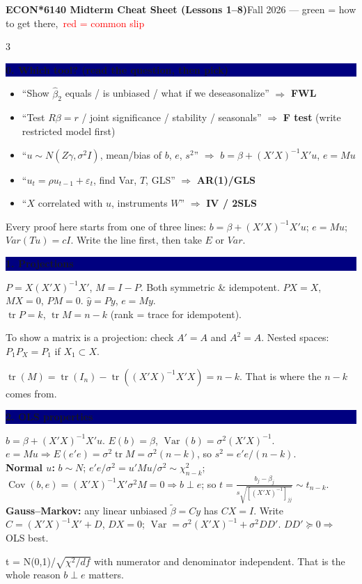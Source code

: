 \documentclass[7.5pt,landscape]{extarticle}
\newcommand{\hd}[1]{\par\vspace{3pt}\noindent\colorbox{navy}{\parbox{\dimexpr\linewidth-2\fboxsep}{\color{white}\bfseries #1}}\par\vspace{1pt}}
\newcommand{\think}[1]{\par\noindent{\color{grn}\textbf{Think:}} {\color{grn}#1}\par}
\newcommand{\warn}[1]{\par\noindent{\color{red}\textbf{Slip:}} {\color{red}#1}\par}
\newcommand{\Var}{\operatorname{Var}}\newcommand{\Cov}{\operatorname{Cov}}\newcommand{\E}{\mathbb E}
\begin{document}
{\large\bfseries ECON*6140 Midterm Cheat Sheet (Lessons 1--8)}\hfill{\scriptsize Fall 2026 --- \textcolor{grn}{green = how to get there},\ \textcolor{red}{red = common slip}}
\begin{multicols}{3}

\hd{0. Which tool? (read the question, then pick)}
\begin{itemize}
\item ``Show $\hat\beta_2$ equals / is unbiased / what if we deseasonalize'' $\Rightarrow$ \textbf{FWL}
\item ``Test $R\beta=r$ / joint significance / stability / seasonals'' $\Rightarrow$ \textbf{F test} (write restricted model first)
\item ``$u\sim N(Z\gamma,\sigma^2I)$, mean/bias of $b$, $e$, $s^2$'' $\Rightarrow$ $b=\beta+(X'X)^{-1}X'u$, $e=Mu$
\item ``$u_t=\rho u_{t-1}+\varepsilon_t$, find Var, $T$, GLS'' $\Rightarrow$ \textbf{AR(1)/GLS}
\item ``$X$ correlated with $u$, instruments $W$'' $\Rightarrow$ \textbf{IV / 2SLS}
\end{itemize}
\think{Every proof here starts from one of three lines: $b=\beta+(X'X)^{-1}X'u$; $e=Mu$; $Var(Tu)=cI$. Write the line first, then take $E$ or $Var$.}

\hd{1. Projections}
$P=X(X'X)^{-1}X'$, $M=I-P$. Both symmetric \& idempotent. $PX=X$, $MX=0$, $PM=0$. $\hat y=Py$, $e=My$.\\
$\operatorname{tr}P=k$, $\operatorname{tr}M=n-k$ (rank = trace for idempotent).
\think{To show a matrix is a projection: check $A'=A$ and $A^2=A$. Nested spaces: $P_1P_X=P_1$ if $X_1\subset X$.}
\warn{$\operatorname{tr}(M)=\operatorname{tr}(I_n)-\operatorname{tr}((X'X)^{-1}X'X)=n-k$. That is where the $n-k$ comes from.}

\hd{2. OLS properties}
$b=\beta+(X'X)^{-1}X'u$. $E(b)=\beta$, $\Var(b)=\sigma^2(X'X)^{-1}$.\\
$e=Mu\Rightarrow E(e'e)=\sigma^2\operatorname{tr}M=\sigma^2(n-k)$, so $s^2=e'e/(n-k)$.\\
\textbf{Normal $u$:} $b\sim N$; $e'e/\sigma^2=u'Mu/\sigma^2\sim\chi^2_{n-k}$; $\Cov(b,e)=(X'X)^{-1}X'\sigma^2M=0\Rightarrow b\perp e$; so $t=\frac{b_j-\beta_j}{s\sqrt{[(X'X)^{-1}]_{jj}}}\sim t_{n-k}$.
\textbf{Gauss--Markov:} any linear unbiased $\tilde\beta=Cy$ has $CX=I$. Write $C=(X'X)^{-1}X'+D$, $DX=0$; $\Var=\sigma^2(X'X)^{-1}+\sigma^2DD'$. $DD'\succeq0\Rightarrow$ OLS best.
\think{t = N(0,1)/$\sqrt{\chi^2/df}$ with numerator and denominator independent. That is the whole reason $b\perp e$ matters.}


\end{multicols}
\end{document}
